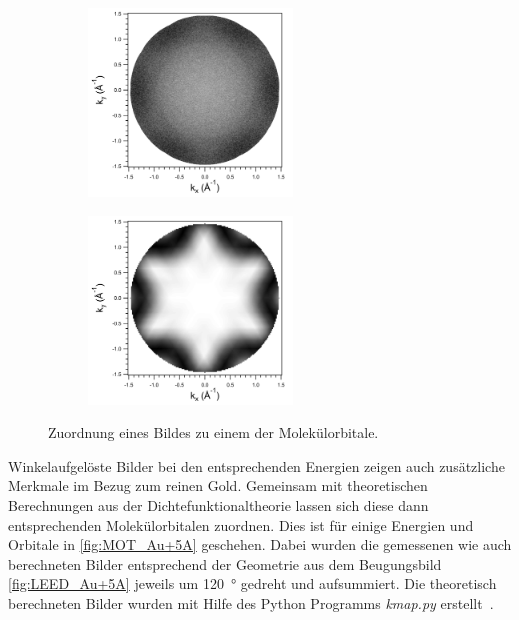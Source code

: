         \begin{figure}
            \centering
            \begin{subfigure}[t]{0.48\textwidth}
                \centering
                \includegraphics[height=5cm]{./content/pictures/Au+5A/IMAGE_2021_06_17_005_BE0_8}
                \label{fig:MOT_Au+5A_exp}
            \end{subfigure}
            \begin{subfigure}[t]{0.48\textwidth}
                \centering
                \includegraphics[height=5cm]{./content/pictures/Au+5A/HOMO1_all_CT}
                \label{fig:MOT_Au+5A_theo}
            \end{subfigure}
            \caption{Zuordnung eines Bildes zu einem der Molekülorbitale.}
            \label{fig:MOT_Au+5A}
        \end{figure}
        Winkelaufgelöste Bilder bei den entsprechenden Energien zeigen auch zusätzliche Merkmale im Bezug zum reinen Gold.
        Gemeinsam mit theoretischen Berechnungen aus der Dichtefunktionaltheorie lassen sich diese dann entsprechenden Molekülorbitalen zuordnen.
        Dies ist für einige Energien und Orbitale in \autoref{fig:MOT_Au+5A} geschehen.
        Dabei wurden die gemessenen wie auch berechneten Bilder entsprechend der Geometrie aus dem Beugungsbild \autoref{fig:LEED_Au+5A} jeweils um \SI{120}{\degree} gedreht und aufsummiert.
        Die theoretisch berechneten Bilder wurden mit Hilfe des Python Programms \textit{kmap.py} erstellt~\cite{brandstetter_kmappy_2021}.

